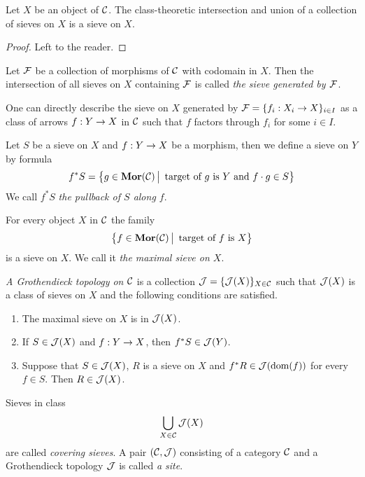 \begin{fact}\label{fact:propertiesofsieves}
Let $X$ be an object of ${\mathcal C}$. The class-theoretic intersection and union of a collection of sieves on $X$ is a sieve on $X$.
\end{fact}
\begin{proof}
Left to the reader.
\end{proof}

\begin{definition}
Let ${\mathcal F}$ be a collection of morphisms of ${\mathcal C}$ with codomain in $X$. Then the intersection of all sieves on $X$ containing ${\mathcal F}$ is called \textit{the sieve generated by ${\mathcal F}$}.
\end{definition}
\noindent
One can directly describe the sieve on $X$ generated by ${\mathcal F} = \{f_i:X_i\rightarrow X\}_{i\in I}$ as a class of arrows $f:Y\rightarrow X$ in ${\mathcal C}$ such that $f$ factors through $f_i$ for some $i\in I$. 

\begin{definition}
Let $S$ be a sieve on $X$ and $f:Y\rightarrow X$ be a morphism, then we define a sieve on $Y$ by formula
$$f^*S=\big\{g\in \mathbf{Mor}({\mathcal C})\,\big|\,\mbox{ target of }g\mbox{ is }Y\mbox{ and }f\cdot g\in S\big\}$$
We call $f^*S$ \textit{the pullback of $S$ along $f$}.
\end{definition}

\begin{definition}
For every object $X$ in ${\mathcal C}$ the family 
$$\big\{f\in \mathbf{Mor}({\mathcal C})\,\big|\,\mbox{ target of }f\mbox{ is }X\big\}$$
is a sieve on $X$. We call it \textit{the maximal sieve on $X$}.
\end{definition}
 
\begin{definition}
\textit{A Grothendieck topology on ${\mathcal C}$} is a collection ${\mathcal J}=\{{\mathcal J}(X)\}_{X\in {\mathcal C}}$ such that ${\mathcal J}(X)$ is a class of sieves on $X$ and the following conditions are satisfied. 
\begin{enumerate}[label=\textbf{(\arabic*)}, leftmargin=1.5em]
\item The maximal sieve on $X$ is in ${\mathcal J}(X)$.
\item If $S\in {\mathcal J}(X)$ and $f:Y\rightarrow X$, then $f^*S\in {\mathcal J}(Y)$.
\item Suppose that $S\in {\mathcal J}(X)$, $R$ is a sieve on $X$ and $f^*R\in {\mathcal J}(\mathrm{dom}(f))$ for every $f\in S$. Then $R\in {\mathcal J}(X)$.
\end{enumerate}
Sieves in class
$$\bigcup_{X\in {\mathcal C}}{\mathcal J}(X)$$
are called \textit{covering sieves}. A pair $({\mathcal C},{\mathcal J})$ consisting of a category ${\mathcal C}$ and a Grothendieck topology ${\mathcal J}$ is called \textit{a site}.
\end{definition}

